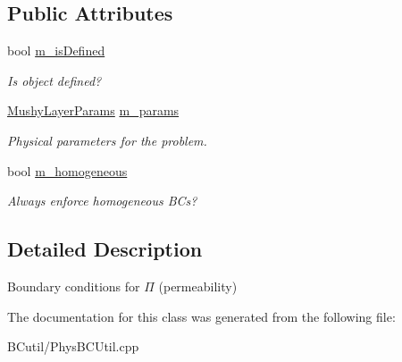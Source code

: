 \subsection*{Public Attributes}
\begin{DoxyCompactItemize}
\item 
\hypertarget{class_basic_permeability_b_c_function_aa689c230dc12d9bd4efd249922033a7b}{bool \hyperlink{class_basic_permeability_b_c_function_aa689c230dc12d9bd4efd249922033a7b}{m\-\_\-is\-Defined}}\label{class_basic_permeability_b_c_function_aa689c230dc12d9bd4efd249922033a7b}

\begin{DoxyCompactList}\small\item\em Is object defined? \end{DoxyCompactList}\item 
\hypertarget{class_basic_permeability_b_c_function_a3fb07b9f25cdb4672e695ab382a2532d}{\hyperlink{class_mushy_layer_params}{Mushy\-Layer\-Params} \hyperlink{class_basic_permeability_b_c_function_a3fb07b9f25cdb4672e695ab382a2532d}{m\-\_\-params}}\label{class_basic_permeability_b_c_function_a3fb07b9f25cdb4672e695ab382a2532d}

\begin{DoxyCompactList}\small\item\em Physical parameters for the problem. \end{DoxyCompactList}\item 
\hypertarget{class_basic_permeability_b_c_function_a1c5c9c448f154cf57daa5ae3c04807f1}{bool \hyperlink{class_basic_permeability_b_c_function_a1c5c9c448f154cf57daa5ae3c04807f1}{m\-\_\-homogeneous}}\label{class_basic_permeability_b_c_function_a1c5c9c448f154cf57daa5ae3c04807f1}

\begin{DoxyCompactList}\small\item\em Always enforce homogeneous B\-Cs? \end{DoxyCompactList}\end{DoxyCompactItemize}


\subsection{Detailed Description}
Boundary conditions for $\Pi$ (permeability) 

The documentation for this class was generated from the following file\-:\begin{DoxyCompactItemize}
\item 
B\-Cutil/Phys\-B\-C\-Util.\-cpp\end{DoxyCompactItemize}
